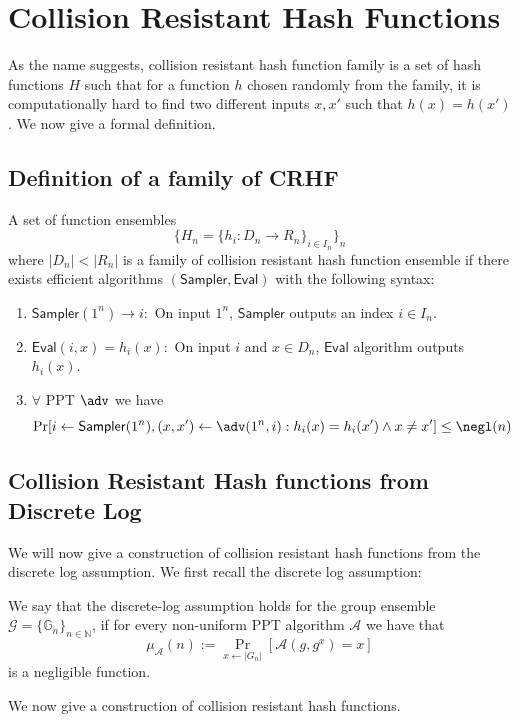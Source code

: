 \documentclass[12pt]{tufte-book}
\newcommand{\Sampler}{\mathsf{Sampler}}
\newcommand{\Eval}{\mathsf{Eval}}
\begin{document}
\section{Collision Resistant Hash Functions}

As the name suggests, collision resistant hash function family is a set of hash functions $H$ such that for a function $h$ chosen randomly from the family, it is computationally hard to find two different inputs $x,x'$ such that $h(x) = h(x')$. We now give a formal definition.

\subsection{Definition of a family of CRHF}

A set of function ensembles
\[ \{H_n = \{h_i : D_n \to R_n \}_{i \in I_n} \}_n\]
where $|D_n| < |R_n|$ is a family of collision resistant hash function ensemble if there exists efficient algorithms $(\Sampler,\Eval)$ with the following syntax:
\begin{enumerate}
\item $\Sampler(1^n) \to i:$ On input $1^n$, $\Sampler$ outputs an index $i \in I_n$.
\item $\Eval(i,x) = h_i(x):$ On input $i$ and $x \in D_n$, $\Eval$ algorithm outputs $h_i(x)$. 
\item $\forall$ PPT $\adv$ we have
\[\Pr[i \gets \Sampler(1^n), (x,x') \gets \adv(1^n,i) : h_i(x) = h_i(x') \wedge x \neq x'] \leq \negl(n)\]
\end{enumerate}


\subsection{Collision Resistant Hash functions from Discrete Log}
We will now give a construction of collision resistant hash functions from the discrete log assumption. We first recall the discrete log assumption:
\begin{definition}
We say that the discrete-log assumption holds for the group ensemble $\mathcal{G} =\{ \mathbb{G}_n\}_{n \in \mathbb{N}}$, if for every non-uniform PPT algorithm $\mathcal{A}$ we have that
\[\mu_\mathcal{A}(n) := \Pr_{x \leftarrow |G_n|}[\mathcal{A}(g,g^x) = x]\]
is a negligible function.
\end{definition}

We now give a construction of collision resistant hash functions.  
\end{document}
